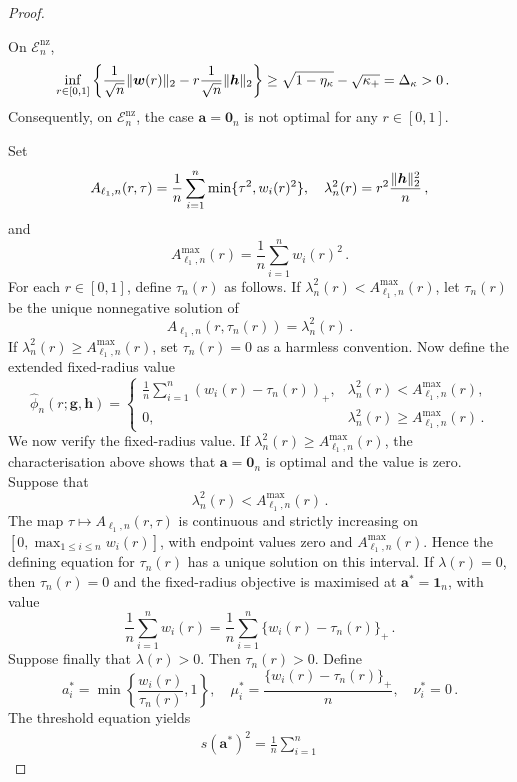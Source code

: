 \documentclass{article}
\makeatletter
\theoremstyle{definition}
\newcommand{\vnorm}[1]{%
	\ensuremath{%
		\if@display
		\left\| #1 \right\|
		\else
		\| #1 \|
		\fi
	}%
}
\newcommand*{\bb}{\boldsymbol}
\def\bh{\bb{h}}
\def\bg{\bb{g}}
\makeatother
\begin{document}
\begin{bibunit}
\begin{proof}
\begin{enumerate}[label=(\roman{*})]
			On $\mathcal E_n^{\mathrm{nz}}$,
			$$
			\begin{aligned}
			\underset{r\in[0,1]}{\inf}
			\left\{
			\frac{1}{\sqrt n}\vnorm{\bb w(r)}_2
			-
			r\frac{1}{\sqrt n}\vnorm{\bh}_2
			\right\}
			&\geq
			\sqrt{1-\eta_\kappa}
			-
			\sqrt{\kappa_+}
			=
			\Delta_\kappa
			>
			0 \,.
			\end{aligned}
			$$
			Consequently, on $\mathcal E_n^{\mathrm{nz}}$, the case
			$\bb a=\bb 0_n$ is not optimal for any $r\in[0,1]$.
		\end{enumerate}
		Set
		$$
		A_{\ell_1,n}(r,\tau)
		=
		\frac{1}{n}\sum_{i=1}^{n}\min\{\tau^2,w_i(r)^2\},
		\quad
		\lambda_n^2(r)
		=
		r^2\frac{\vnorm{\bh}_2^2}{n}\,,
		$$
		and
		$$
		A_{\ell_1,n}^{\max}(r)
		=
		\frac{1}{n}\sum_{i=1}^{n}w_i(r)^2\,.
		$$
		For each $r\in[0,1]$, define $\tau_n(r)$ as follows. If
		$\lambda_n^2(r)<A_{\ell_1,n}^{\max}(r)$, let $\tau_n(r)$ be the unique
		nonnegative solution of
		$$
		A_{\ell_1,n}(r,\tau_n(r))
		=
		\lambda_n^2(r)\,.
		$$
		If $\lambda_n^2(r)\geq A_{\ell_1,n}^{\max}(r)$, set
		$\tau_n(r)=0$ as a harmless convention.
		Now define the extended fixed-radius value
		$$
		\widehat\phi_n(r;\bg,\bh)
		=
		\begin{cases}
		\displaystyle
		\frac{1}{n}\sum_{i=1}^n
			\left(w_i(r)-\tau_n(r)\right)_+,
		&
		\lambda_n^2(r)<A_{\ell_1,n}^{\max}(r),
		\\
		0,
		&
		\lambda_n^2(r)\geq A_{\ell_1,n}^{\max}(r)\,.
		\end{cases}
		$$
		We now verify the fixed-radius value. If
		$\lambda_n^2(r)\geq A_{\ell_1,n}^{\max}(r)$, the characterisation
		above shows that $\bb a=\bb0_n$ is optimal and the value is zero.
		Suppose that
		$$
		\lambda_n^2(r)<A_{\ell_1,n}^{\max}(r) \,.
		$$
		The map $\tau\mapsto A_{\ell_1,n}(r,\tau)$ is continuous and
		strictly increasing on
		$[0,\max_{1\leq i\leq n}w_i(r)]$, with endpoint values zero and
		$A_{\ell_1,n}^{\max}(r)$. Hence the defining equation for
		$\tau_n(r)$ has a unique solution on this interval. If
		$\lambda(r)=0$, then $\tau_n(r)=0$ and the fixed-radius objective
		is maximised at $\bb a^*=\bb1_n$, with value
		$$
		\frac1n\sum_{i=1}^nw_i(r)
		=
		\frac1n\sum_{i=1}^n\{w_i(r)-\tau_n(r)\}_+\,.
		$$
		Suppose finally that $\lambda(r)>0$. Then $\tau_n(r)>0$. Define
		$$
		a_i^*
		=
		\min\left\{\frac{w_i(r)}{\tau_n(r)},1\right\},
		\quad
		\mu_i^*
		=
		\frac{\{w_i(r)-\tau_n(r)\}_+}{n},
		\quad
		\nu_i^*=0\,.
		$$
		The threshold equation yields
		$$
		\begin{aligned}
		s(\bb a^*)^2
		=
		\frac1n\sum_{i=1}^n

\end{aligned}$$
\end{proof}
\end{bibunit}
\end{document}
